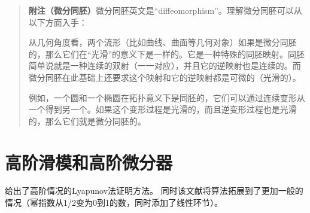 \begin{quote}
	\textbf{附注（微分同胚）}微分同胚英文是“diffeomorphism”。理解微分同胚可以从以下方面入手：
		
		从几何角度看，两个流形（比如曲线、曲面等几何对象）如果是微分同胚的，那么它们在“光滑”的意义下是一样的。它是一种特殊的同胚映射。同胚简单说就是一种连续的双射（一一对应），并且它的逆映射也是连续的。而微分同胚在此基础上还要求这个映射和它的逆映射都是可微的（光滑的）。
		
		例如，一个圆和一个椭圆在拓扑意义下是同胚的，它们可以通过连续变形从一个得到另一个。如果这个变形过程是光滑的，而且逆变形过程也是光滑的，那么它们就是微分同胚的。
\end{quote}

\section{高阶滑模和高阶微分器}

\cite{morenoSurveyHighorderSlidingmode2023}给出了高阶情况的Lyapunov法证明方法。
同时该文献将算法拓展到了更加一般的情况（幂指数从1/2变为0到1的数，同时添加了线性环节）。

